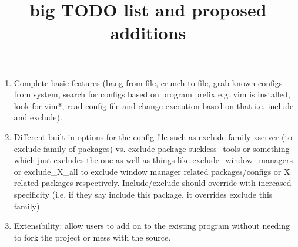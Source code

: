 \documentclass[12pt]{article}
\title{big TODO list and proposed additions}
\begin{document}
    \begin{enumerate}
        \item Complete basic features (bang from file, crunch to file, grab known configs from system, search for configs based on program prefix e.g. vim is installed, look for vim*, read config file and change execution based on that i.e. include and exclude).
        \item Different built in options for the config file such as exclude family xserver (to exclude family of packages) vs. exclude package suckless_tools or something which just excludes the one as well as things like exclude_window_managers or exclude_X_all to exclude window manager related packages/configs or X related packages respectively.  Include/exclude should override with increased specificity (i.e. if they say include this package, it overrides exclude this family)
        \item Extensibility: allow users to add on to the existing program without needing to fork the project or mess with the source.
    \end{enumerate}
\end{document}
